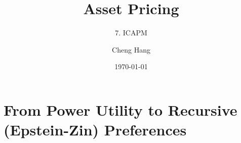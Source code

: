 \documentclass{beamer}
\title[Asset Pricing]{\textbf{Asset Pricing}} %
\subtitle{7. ICAPM}
\author[Cheng Hang]{Cheng Hang} %
\institute[DUFE] %
{School of Fintech \\
Dongbei University of Finance \& Economics \\ %
\medskip
\textbf{chenghangch@qq.com}%
}
\date{\today} %
\begin{document}
\begin{frame}
\titlepage %
\end{frame}



\section{From Power Utility to Recursive (Epstein-Zin) Preferences}
\end{document}

